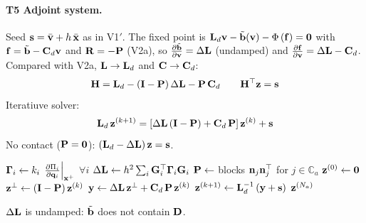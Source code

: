 \paragraph{T5 Adjoint system.}\mbox{}
\newline Seed $\mathbf{s} = \bar{\mathbf{v}} + h\,\bar{\mathbf{x}}$ as in V1$'$. The fixed point is $\mathbf{L}_d\mathbf{v} - \tilde{\mathbf{b}}(\mathbf{v}) - \Phi\left(\mathbf{f}\right) = \mathbf{0}$ with $\mathbf{f} = \tilde{\mathbf{b}} - \mathbf{C}_d\mathbf{v}$ and $\mathbf{R} = -\mathbf{P}$ (V2a), so $\frac{\partial \tilde{\mathbf{b}}}{\partial \mathbf{v}} = \Delta\mathbf{L}$ (undamped) and $\frac{\partial \mathbf{f}}{\partial \mathbf{v}} = \Delta\mathbf{L} - \mathbf{C}_d$. Compared with V2a, $\mathbf{L} \to \mathbf{L}_d$ and $\mathbf{C} \to \mathbf{C}_d$:
\begin{equation*}
    \mathbf{H} = \mathbf{L}_d - \left(\mathbf{I} - \mathbf{P}\right)\Delta\mathbf{L} - \mathbf{P}\,\mathbf{C}_d
    \qquad
    \mathbf{H}^\top\mathbf{z} = \mathbf{s}
\end{equation*}
Iteratiuve solver:
\begin{equation*}
    \mathbf{L}_d\,\mathbf{z}^{(k+1)} = \left[\Delta\mathbf{L}\left(\mathbf{I} - \mathbf{P}\right) + \mathbf{C}_d\,\mathbf{P}\right]\mathbf{z}^{(k)} + \mathbf{s}
\end{equation*}
\noindent No contact ($\mathbf{P} = \mathbf{0}$): $\left(\mathbf{L}_d - \Delta\mathbf{L}\right)\mathbf{z} = \mathbf{s}$.
\begin{algorithm}[H]
\caption{D: adjoint solve for one step (changes from Alg.~\ref{alg:npd_v2a_adjoint}: $\LL_d$, $\C_d$).}
\label{alg:npd_d_adjoint}
\begin{algorithmic}[1]
    \State $\boldsymbol{\Gamma}_i \gets k_i\,\left.\frac{\partial \Pi_i}{\partial \mathbf{q}_i}\right|_{\mathbf{x}^+}$ \quad $\forall i$ 
    \State $\Delta\mathbf{L} \gets h^2\sum_i \mathbf{G}_i^\top\boldsymbol{\Gamma}_i\mathbf{G}_i$ %
    \State $\mathbf{P} \gets$ blocks $\mathbf{n}_j\mathbf{n}_j^\top$ for $j \in \mathbb{C}_a$ %
    \State $\mathbf{z}^{(0)} \gets \mathbf{0}$
        \State $\mathbf{z}^\perp \gets \left(\mathbf{I} - \mathbf{P}\right)\mathbf{z}^{(k)}$
        \State $\mathbf{y} \gets \Delta\mathbf{L}\,\mathbf{z}^\perp + \mathbf{C}_d\,\mathbf{P}\,\mathbf{z}^{(k)}$ 
        \State $\mathbf{z}^{(k+1)} \gets \mathbf{L}_d^{-1}\left(\mathbf{y} + \mathbf{s}\right)$ 
    \EndFor
    \State \Return $\mathbf{z}^{(N_a)}$
\EndFunction
\end{algorithmic}
\end{algorithm}
\noindent $\Delta\mathbf{L}$ is undamped: $\tilde{\mathbf{b}}$ does not contain $\mathbf{D}$.


